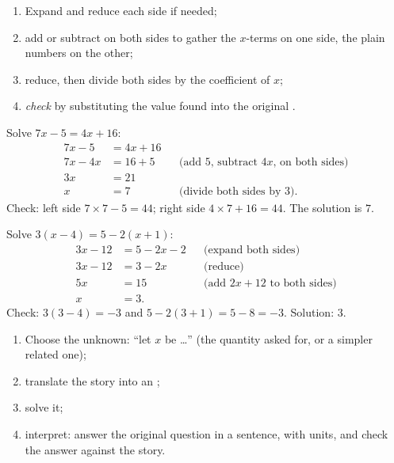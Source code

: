 \begin{method}\label{met:g8:equations:solve}
\begin{enumerate}
  \item Expand and reduce each side if needed;
  \item add or subtract on both sides to gather the $x$-terms on one
        side, the plain numbers on the other;
  \item reduce, then divide both sides by the coefficient of $x$;
  \item \emph{check} by substituting the value found into the original
        .
\end{enumerate}
\end{method}

\begin{example}\label{ex:g8:equations:solve}
Solve $7x - 5 = 4x + 16$:
\begin{align*}
7x - 5 &= 4x + 16 \\
7x - 4x &= 16 + 5
&& \text{(add $5$, subtract $4x$, on both sides)} \\
3x &= 21 \\
x &= 7 && \text{(divide both sides by 3).}
\end{align*}
Check: left side $7 \times 7 - 5 = 44$; right side
$4 \times 7 + 16 = 44$. The solution is $7$.
\end{example}

\begin{example}\label{ex:g8:equations:brackets}
Solve $3(x - 4) = 5 - 2(x + 1)$:
\begin{align*}
3x - 12 &= 5 - 2x - 2 && \text{(expand both sides)} \\
3x - 12 &= 3 - 2x && \text{(reduce)} \\
5x &= 15 && \text{(add $2x + 12$ to both sides)} \\
x &= 3 .
\end{align*}
Check: $3(3 - 4) = -3$ and $5 - 2(3+1) = 5 - 8 = -3$. \quad Solution:
$3$.
\end{example}

\begin{method}\label{met:g8:equations:problem}
\begin{enumerate}
  \item Choose the unknown: ``let $x$ be \dots'' (the quantity asked
        for, or a simpler related one);
  \item translate the story into an ;
  \item solve it;
  \item interpret: answer the original question in a sentence, with
        units, and check the answer against the story.
\end{enumerate}
\end{method}

